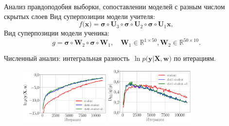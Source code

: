 \documentclass[10pt,pdf,hyperref={unicode}]{beamer}
\begin{document}

\begin{frame}{Анализ правдоподобия выборки, сопоставлении моделей с разным числом скрытых слоев}
\justifying
Вид суперпозиции модели учителя:
$$
f\bigr(\mathbf{x}\bigr) = \bm{\sigma} \circ \mathbf{U}_3\circ \bm{\sigma} \circ \mathbf{U}_2\circ\bm{\sigma}\circ \mathbf{U}_1\mathbf{x},
$$
Вид суперпозиции модели ученика:
$$
g = \bm{\sigma} \circ \mathbf{W}_2 \circ \bm{\sigma} \circ \mathbf{W}_1, \quad \mathbf{W}_{1} \in \mathbb{R}^{1 \times 50}, \mathbf{W}_{2} \in \mathbb{R}^{50 \times 10}.
$$
\begin{table}[]
\begin{center}
\end{center}
\end{table}

Численный анализ: интегральная разность~$\ln p\bigr(\mathbf{y}|\mathbf{X}, \mathbf{w}\bigr)$ по итерациям.

\begin{figure}[h!]
\includegraphics[width=0.4\textwidth]{figures/synthetic_likelihood_2_layers.eps}
\includegraphics[width=0.4\textwidth]{figures/synthetic_D_KL_2_layers.eps}
\end{figure}

\end{frame}
\end{document}
